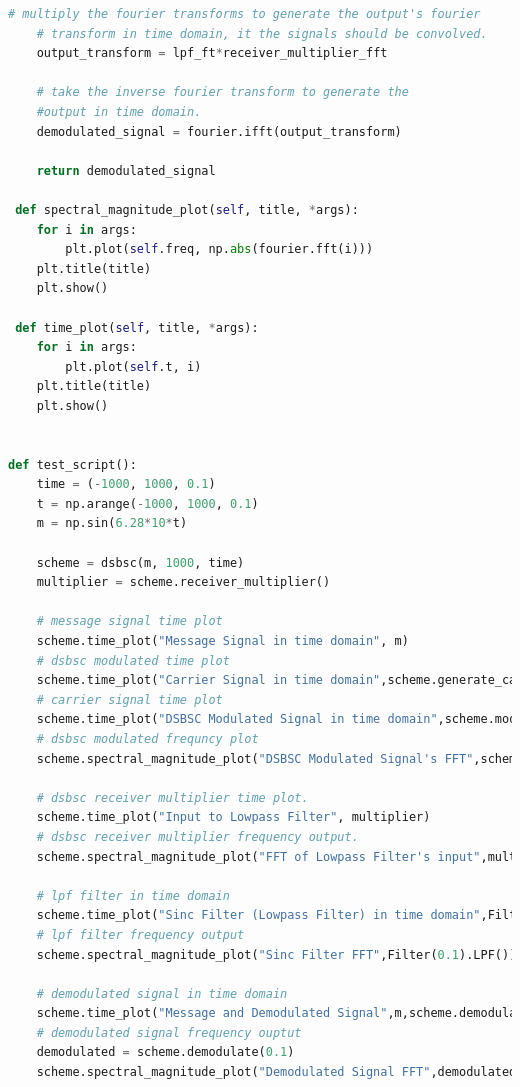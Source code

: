 \documentclass[12pt,a4paper]{article}%
\begin{document}
\begin{flushleft}
\begin{lstlisting}[language=python]
	# multiply the fourier transforms to generate the output's fourier
	# transform in time domain, it the signals should be convolved.
	output_transform = lpf_ft*receiver_multiplier_fft
	
	# take the inverse fourier transform to generate the 
	#output in time domain.
	demodulated_signal = fourier.ifft(output_transform)
	
	return demodulated_signal
		
 def spectral_magnitude_plot(self, title, *args):
	for i in args:
		plt.plot(self.freq, np.abs(fourier.fft(i)))
	plt.title(title)
	plt.show()
		
 def time_plot(self, title, *args):
	for i in args:
		plt.plot(self.t, i)
	plt.title(title)
	plt.show()
		
	
def test_script():
	time = (-1000, 1000, 0.1)
	t = np.arange(-1000, 1000, 0.1)
	m = np.sin(6.28*10*t)
	
	scheme = dsbsc(m, 1000, time)
	multiplier = scheme.receiver_multiplier()
	
	# message signal time plot
	scheme.time_plot("Message Signal in time domain", m)
	# dsbsc modulated time plot
	scheme.time_plot("Carrier Signal in time domain",scheme.generate_carrier())
	# carrier signal time plot
	scheme.time_plot("DSBSC Modulated Signal in time domain",scheme.modulate())
	# dsbsc modulated frequncy plot
	scheme.spectral_magnitude_plot("DSBSC Modulated Signal's FFT",scheme.modulate())
	
	# dsbsc receiver multiplier time plot.
	scheme.time_plot("Input to Lowpass Filter", multiplier)
	# dsbsc receiver multiplier frequency output.
	scheme.spectral_magnitude_plot("FFT of Lowpass Filter's input",multiplier)
	
	# lpf filter in time domain
	scheme.time_plot("Sinc Filter (Lowpass Filter) in time domain",Filter(0.1).LPF())
	# lpf filter frequency output
	scheme.spectral_magnitude_plot("Sinc Filter FFT",Filter(0.1).LPF())
	
	# demodulated signal in time domain
	scheme.time_plot("Message and Demodulated Signal",m,scheme.demodulate(0.1)/16.0)
	# demodulated signal frequency ouptut
	demodulated = scheme.demodulate(0.1)
	scheme.spectral_magnitude_plot("Demodulated Signal FFT",demodulated)
		\end{lstlisting}

\end{flushleft}
\end{document}
